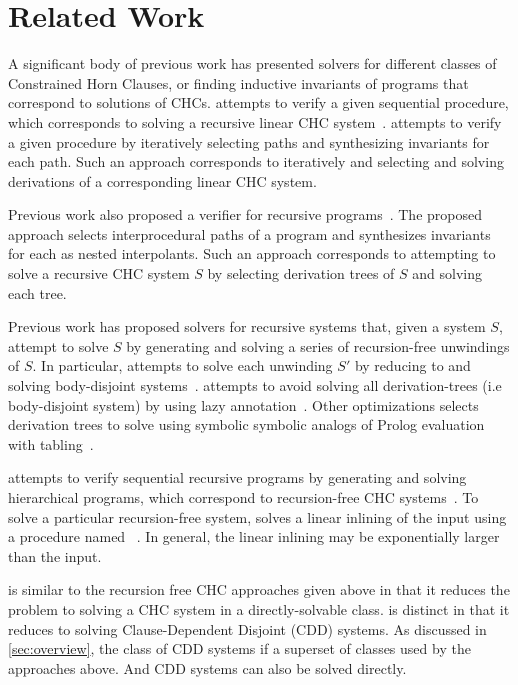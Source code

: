 \section{Related Work}
\label{sec:related-work}
A significant body of previous work has presented solvers for
different classes of Constrained Horn Clauses, or finding inductive
invariants of programs that correspond to solutions of CHCs.
\impact attempts to verify a given sequential procedure, which
corresponds to solving a recursive linear CHC
system~\cite{mcmillan06}.
%
\impact attempts to verify a given procedure by iteratively selecting
paths and synthesizing invariants for each path.
%
Such an approach corresponds to iteratively and selecting and solving
derivations of a corresponding linear CHC system.

Previous work also proposed a verifier for recursive
programs~\cite{heizmann10}.
%
The proposed approach selects interprocedural paths of a program and
synthesizes invariants for each as nested interpolants.
%
Such an approach corresponds to attempting to solve a recursive CHC
system $S$ by selecting derivation trees of $S$
and solving each tree.

Previous work has proposed solvers for recursive systems that, given a
system $S$, attempt to solve $S$ by generating and
solving a series of recursion-free unwindings of $S$.
%
In particular, \eldarica attempts to solve each unwinding
$S'$ by reducing to and solving body-disjoint systems~\cite{rummer13a,rummer13b}.
%
\duality attempts to avoid solving all derivation-trees (i.e
body-disjoint system) by using lazy annotation~\cite{bjorner13}.
%
Other optimizations selects derivation trees to solve using symbolic
symbolic analogs of Prolog evaluation with
tabling~\cite{jaffar09,mcmillan14}.
%

\whale attempts to verify sequential recursive programs by generating
and solving hierarchical programs, which correspond to recursion-free CHC
systems~\cite{albarghouthi12b}.
%
To solve a particular recursion-free system, \whale solves a linear
inlining of the input using a procedure named
\vinta~\cite{albarghouthi12a}.
%
In general, the linear inlining may be exponentially larger than the
input.

\sys is similar to the recursion free CHC approaches given above in
that it reduces the problem to solving a CHC system in a
directly-solvable class.
%
\sys is distinct in that it reduces to solving Clause-Dependent
Disjoint (CDD) systems.
%
As discussed in \autoref{sec:overview}, the class of CDD systems if a
superset of classes used by the approaches above. And CDD systems can
also be solved directly.

